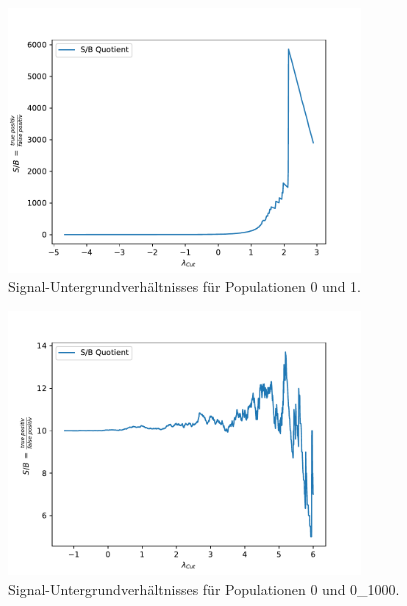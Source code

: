 \begin{figure}
  \centering
  \includegraphics[height = 7cm]{plots/SBRatioplot.pdf}
  \caption{Signal-Untergrundverhältnisses für Populationen 0 und 1.}
  \label{fig:SB1}
\end{figure}
\begin{figure}
  \centering
  \includegraphics[height = 7cm]{plots/2SBRatioplot.pdf}
  \caption{Signal-Untergrundverhältnisses für Populationen 0 und 0\_1000.}
  \label{fig:SB2}
\end{figure}
